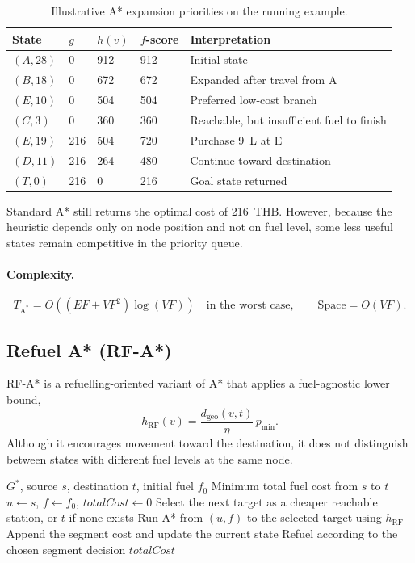 \begin{table}[ht]
\centering
\caption{Illustrative A* expansion priorities on the running example.}
\label{tab:astar_trace}
\small
\begin{tabular}{@{}lllll@{}}
\toprule
State & $g$ & $h(v)$ & $f$-score & Interpretation \\
\midrule
$(A,28)$ & 0 & 912 & 912 & Initial state \\
$(B,18)$ & 0 & 672 & 672 & Expanded after travel from A \\
$(E,10)$ & 0 & 504 & 504 & Preferred low-cost branch \\
$(C,3)$ & 0 & 360 & 360 & Reachable, but insufficient fuel to finish \\
$(E,19)$ & 216 & 504 & 720 & Purchase 9~L at E \\
$(D,11)$ & 216 & 264 & 480 & Continue toward destination \\
$(T,0)$ & 216 & 0 & 216 & Goal state returned \\
\bottomrule
\end{tabular}
\end{table}

Standard A* still returns the optimal cost of 216~THB. However, because the heuristic depends only on node position and not on fuel level, some less useful states remain competitive in the priority queue.

\paragraph{Complexity.}
\[
T_{\mathrm{A^{*}}}=O\!\left((EF+VF^{2})\log(VF)\right)
\quad \text{in the worst case},
\qquad
\text{Space}=O(VF).
\]

\subsection{Refuel A* (RF-A*)}
\label{subsec:rfastar}

RF-A* is a refuelling-oriented variant of A* that applies a fuel-agnostic lower bound,
\[
h_{\mathrm{RF}}(v)=\frac{d_{\mathrm{geo}}(v,t)}{\eta}\,p_{\min}.
\]
Although it encourages movement toward the destination, it does not distinguish between states with different fuel levels at the same node.

\begin{algorithm}[H]
\caption{RF-A* Search for Fuel-Aware Routing}
\label{alg:rfastar}
\begin{algorithmic}[1]
\Require $G^{*}$, source $s$, destination $t$, initial fuel $f_0$
\Ensure Minimum total fuel cost from $s$ to $t$
\State $u \gets s$, $f \gets f_0$, $\mathit{totalCost} \gets 0$
    \State Select the next target as a cheaper reachable station, or $t$ if none exists
    \State Run A* from $(u,f)$ to the selected target using $h_{\mathrm{RF}}$
    \State Append the segment cost and update the current state
        \State Refuel according to the chosen segment decision
    \EndIf
\EndWhile
\State \Return $\mathit{totalCost}$
\end{algorithmic}
\end{algorithm}

